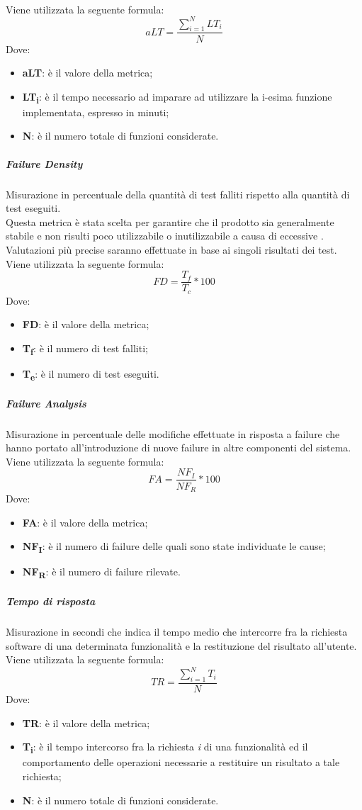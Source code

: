 \\Viene utilizzata la seguente formula:
$$aLT=\frac{\sum\limits_{i=1}^N{LT_i}}{N}$$
Dove:
\begin{itemize}
	\item{\textbf{aLT}: è il valore della metrica;}
	\item{\textbf{LT\textsubscript{i}}: è il tempo necessario ad imparare ad utilizzare la i-esima funzione implementata, espresso in minuti;}
	\item{\textbf{N}: è il numero totale di funzioni considerate.}
\end{itemize}

\subparagraph{Failure Density}\Spazio
Misurazione in percentuale della quantità di test falliti rispetto alla quantità di test eseguiti.
\\Questa metrica è stata scelta per garantire che il prodotto sia generalmente stabile e non risulti poco utilizzabile o inutilizzabile a causa di eccessive . Valutazioni più precise saranno effettuate in base ai singoli risultati dei test.\\
Viene utilizzata la seguente formula:
$$FD=\frac{T_f}{T_c}*100$$
Dove:
\begin{itemize}
	\item{\textbf{FD}: è il valore della metrica;}
	\item{\textbf{T\textsubscript{f}}: è il numero di test falliti;}
	\item{\textbf{T\textsubscript{e}}: è il numero di test eseguiti.}
\end{itemize}

\subparagraph{Failure Analysis}\Spazio
Misurazione in percentuale delle modifiche effettuate in risposta a failure che hanno portato all'introduzione di nuove failure in altre componenti del sistema. \\
Viene utilizzata la seguente formula:
$$FA=\frac{NF_I}{NF_R}*100$$
Dove:
\begin{itemize}
	\item{\textbf{FA}: è il valore della metrica;}
	\item{\textbf{NF\textsubscript{I}}: è il numero di failure delle quali sono state individuate le cause;}
	\item{\textbf{NF\textsubscript{R}}: è il numero di failure rilevate.}
\end{itemize}

\subparagraph{Tempo di risposta}\Spazio
Misurazione in secondi che indica il tempo medio che intercorre fra la richiesta software di una determinata funzionalità e la restituzione del risultato all'utente. \\
Viene utilizzata la seguente formula:
$$TR=\frac{\sum\limits_{i=1}^N{T_i}}{N}$$
Dove:
\begin{itemize}
	\item{\textbf{TR}: è il valore della metrica;}
	\item{\textbf{T\textsubscript{i}}: è il tempo intercorso fra la richiesta \emph{i} di una funzionalità ed il comportamento delle operazioni necessarie a restituire un risultato a tale richiesta;}
	\item{\textbf{N}: è il numero totale di funzioni considerate.}
\end{itemize}


